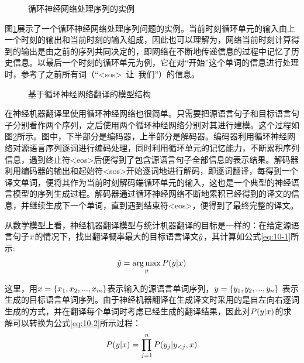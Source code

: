 \begin{figure}[htp]
\centering

\caption{循环神经网络处理序列的实例}
\label{fig:10-8}
\end{figure}

\parinterval 图\ref{fig:10-8}展示了一个循环神经网络处理序列问题的实例。当前时刻循环单元的输入由上一个时刻的输出和当前时刻的输入组成，因此也可以理解为，网络当前时刻计算得到的输出是由之前的序列共同决定的，即网络在不断地传递信息的过程中记忆了历史信息。以最后一个时刻的循环单元为例，它在对“开始”这个单词的信息进行处理时，参考了之前所有词（“<sos>\ 让\ 我们”）的信息。

\begin{figure}[htp]
\centering

\caption{基于循环神经网络翻译的模型结构}
\label{fig:10-9}
\end{figure}

\parinterval 在神经机器翻译里使用循环神经网络也很简单。只需要把源语言句子和目标语言句子分别看作两个序列，之后使用两个循环神经网络分别对其进行建模。这个过程如图\ref{fig:10-9}所示。图中，下半部分是编码器，上半部分是解码器。编码器利用循环神经网络对源语言序列逐词进行编码处理，同时利用循环单元的记忆能力，不断累积序列信息，遇到终止符<eos>后便得到了包含源语言句子全部信息的表示结果。解码器利用编码器的输出和起始符<sos>开始逐词地进行解码，即逐词翻译，每得到一个译文单词，便将其作为当前时刻解码端循环单元的输入，这也是一个典型的神经语言模型的序列生成过程。解码器通过循环神经网络不断地累积已经得到的译文的信息，并继续生成下一个单词，直到遇到结束符<eos>，便得到了最终完整的译文。

\vspace{0.3em}
\parinterval 从数学模型上看，神经机器翻译模型与统计机器翻译的目标是一样的：在给定源语言句子${x}$的情况下，找出翻译概率最大的目标语言译文$\hat{{y}}$，其计算如公式\eqref{eq:10-1}所示:
\begin{eqnarray}
\hat{{{y}}} = \operatorname*{arg\,max}_{{{y}}} {P} ({{y}} | {{x}})
\label{eq:10-1}
\end{eqnarray}

\noindent 这里，用${{x}}=\{ x_1,x_2,..., x_m \}$表示输入的源语言单词序列，${{y}}=\{ y_1,y_2,..., y_n \}$ 表示生成的目标语言单词序列。由于神经机器翻译在生成译文时采用的是自左向右逐词生成的方式，并在翻译每个单词时考虑已经生成的翻译结果，因此对$ {P} ({{y}} | {{x}})$的求解可以转换为公式\eqref{eq:10-2}所示过程：
\begin{eqnarray}
{P} ({{y}} | {{x}}) = \prod_{j=1}^{n} {P} ( y_j | {{y}}_{<j }, {{x}}  )
\label{eq:10-2}
\end{eqnarray}

